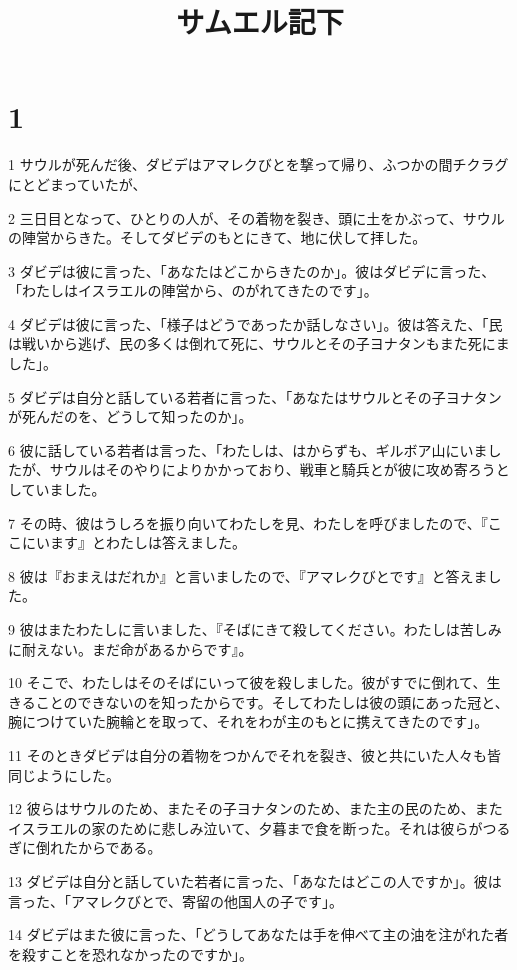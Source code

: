 

\title{サムエル記下}


\chapter{1}

\par 1 サウルが死んだ後、ダビデはアマレクびとを撃って帰り、ふつかの間チクラグにとどまっていたが、
\par 2 三日目となって、ひとりの人が、その着物を裂き、頭に土をかぶって、サウルの陣営からきた。そしてダビデのもとにきて、地に伏して拝した。
\par 3 ダビデは彼に言った、「あなたはどこからきたのか」。彼はダビデに言った、「わたしはイスラエルの陣営から、のがれてきたのです」。
\par 4 ダビデは彼に言った、「様子はどうであったか話しなさい」。彼は答えた、「民は戦いから逃げ、民の多くは倒れて死に、サウルとその子ヨナタンもまた死にました」。
\par 5 ダビデは自分と話している若者に言った、「あなたはサウルとその子ヨナタンが死んだのを、どうして知ったのか」。
\par 6 彼に話している若者は言った、「わたしは、はからずも、ギルボア山にいましたが、サウルはそのやりによりかかっており、戦車と騎兵とが彼に攻め寄ろうとしていました。
\par 7 その時、彼はうしろを振り向いてわたしを見、わたしを呼びましたので、『ここにいます』とわたしは答えました。
\par 8 彼は『おまえはだれか』と言いましたので、『アマレクびとです』と答えました。
\par 9 彼はまたわたしに言いました、『そばにきて殺してください。わたしは苦しみに耐えない。まだ命があるからです』。
\par 10 そこで、わたしはそのそばにいって彼を殺しました。彼がすでに倒れて、生きることのできないのを知ったからです。そしてわたしは彼の頭にあった冠と、腕につけていた腕輪とを取って、それをわが主のもとに携えてきたのです」。
\par 11 そのときダビデは自分の着物をつかんでそれを裂き、彼と共にいた人々も皆同じようにした。
\par 12 彼らはサウルのため、またその子ヨナタンのため、また主の民のため、またイスラエルの家のために悲しみ泣いて、夕暮まで食を断った。それは彼らがつるぎに倒れたからである。
\par 13 ダビデは自分と話していた若者に言った、「あなたはどこの人ですか」。彼は言った、「アマレクびとで、寄留の他国人の子です」。
\par 14 ダビデはまた彼に言った、「どうしてあなたは手を伸べて主の油を注がれた者を殺すことを恐れなかったのですか」。
